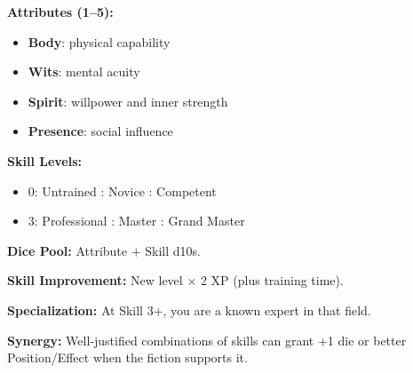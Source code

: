 \begin{tcolorbox}[colback=blue!5!white,colframe=blue!75!black,title=Attributes and Skills Quick Reference,fonttitle=\bfseries]
\textbf{Attributes (1–5):}
\begin{itemize}
  \item \textbf{Body}: physical capability
  \item \textbf{Wits}: mental acuity
  \item \textbf{Spirit}: willpower and inner strength
  \item \textbf{Presence}: social influence
\end{itemize}

\textbf{Skill Levels:}
\begin{itemize}
  \item 0: Untrained : Novice : Competent
  \item 3: Professional : Master : Grand Master
\end{itemize}

\textbf{Dice Pool:} Attribute $+$ Skill d10s.

\textbf{Skill Improvement:} New level $\times$ 2 XP (plus training time).

\textbf{Specialization:} At Skill 3+, you are a known expert in that field.

\textbf{Synergy:} Well‑justified combinations of skills can grant +1 die or
better Position/Effect when the fiction supports it.
\end{tcolorbox}